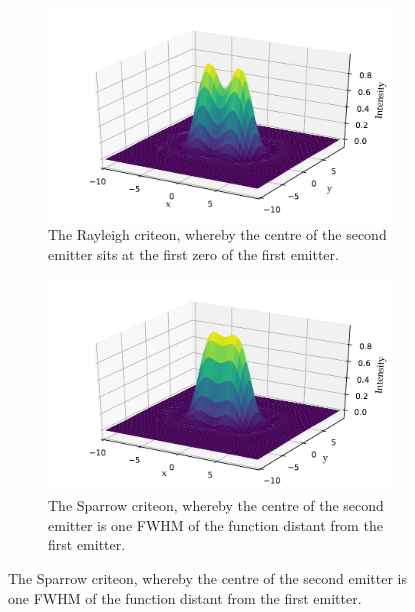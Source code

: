 \begin{figure}
    \centering
    \begin{subfigure}[b]{\textwidth}
        \centering
        \includegraphics{+airy_rayleigh}
        \caption{The Rayleigh criteon, whereby the centre of the second emitter sits at the first zero of the first emitter.}\label{fig:airy_rayleigh}
    \end{subfigure}
    \begin{subfigure}[b]{\textwidth}
        \includegraphics{+airy_sparrow}
        \caption{The Sparrow criteon, whereby the centre of the second emitter is one \gls{FWHM} of the function distant from the first emitter.}\label{fig:airy_sparrow}
    \end{subfigure}
    \end{figure}
